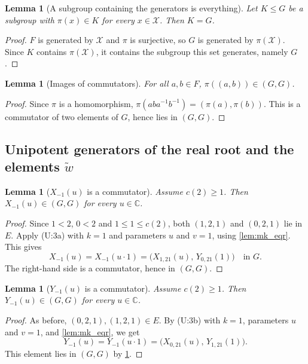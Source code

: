 \documentclass[11pt]{article}
\newtheorem{lemma}[theorem]{Lemma}
\theoremstyle{definition}
\theoremstyle{remark}
\newcommand{\C}{\mathbb{C}}
\newcommand{\wt}{\widetilde{w}}
\newcommand{\comm}{(G,G)}
\begin{document}
\begin{lemma}[A subgroup containing the generators is everything]\label{lem:subgroup_top_of_gens}
Let $K\le G$ be a subgroup with $\pi(x)\in K$ for every $x\in\mathcal X$. Then $K=G$.
\end{lemma}
\begin{proof}
$F$ is generated by $\mathcal X$ and $\pi$ is surjective, so $G$ is generated by $\pi(\mathcal X)$. Since $K$ contains $\pi(\mathcal X)$, it contains the subgroup this set generates, namely $G$.
\end{proof}

\begin{lemma}[Images of commutators]\label{lem:cm_mem_commutator}
For all $a,b\in F$, $\pi((a,b))\in\comm$.
\end{lemma}
\begin{proof}
Since $\pi$ is a homomorphism, $\pi(aba^{-1}b^{-1})=(\pi(a),\pi(b))$. This is a commutator of two elements of $G$, hence lies in $\comm$.
\end{proof}

\subsection{Unipotent generators of the real root and the elements $\wt$}

\begin{lemma}[$X_{-1}(u)$ is a commutator]\label{lem:xm_mem}
Assume $c(2)\ge 1$. Then $X_{-1}(u)\in\comm$ for every $u\in\C$.
\end{lemma}
\begin{proof}
Since $1<2$, $0<2$ and $1\le 1\le c(2)$, both $(1,2,1)$ and $(0,2,1)$ lie in $E$. Apply (U:3a) with $k=1$ and parameters $u$ and $v=1$, using \cref{lem:mk_eqr}. This gives
\[
X_{-1}(u)=X_{-1}(u\cdot 1)=\big(X_{1,21}(u),\,Y_{0,21}(1)\big)\quad\text{in } G .
\]
The right-hand side is a commutator, hence in $\comm$.
\end{proof}

\begin{lemma}[$Y_{-1}(u)$ is a commutator]\label{lem:ym_mem}
Assume $c(2)\ge 1$. Then $Y_{-1}(u)\in\comm$ for every $u\in\C$.
\end{lemma}
\begin{proof}
As before, $(0,2,1),(1,2,1)\in E$. By (U:3b) with $k=1$, parameters $u$ and $v=1$, and \cref{lem:mk_eqr}, we get
\[
Y_{-1}(u)=Y_{-1}(u\cdot1)=\big(X_{0,21}(u),\,Y_{1,21}(1)\big).
\]
This element lies in $\comm$ by \cref{lem:cm_mem_commutator}.
\end{proof}
\end{document}
